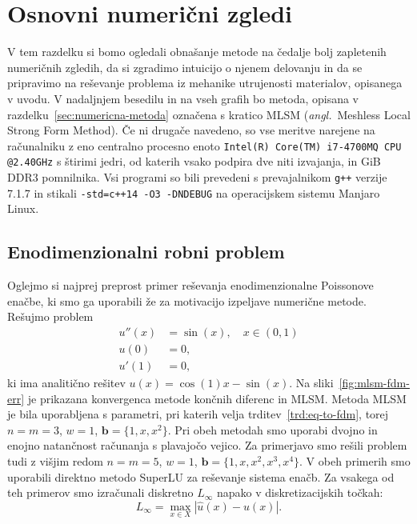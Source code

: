\documentclass[12pt,a4paper,twoside]{article}
\theoremstyle{definition} %
\theoremstyle{plain} %
\numberwithin{equation}{section}
\renewcommand{\b}{\boldsymbol}
\newcommand{\ang}[1]{(\textit{angl.}\ #1)}
\begin{document}
\section{Osnovni numerični zgledi}
\label{sec:osnovni-zgledi}
V tem razdelku si bomo ogledali obnašanje metode na čedalje bolj zapletenih numeričnih zgledih, da
si zgradimo intuicijo o njenem delovanju in da se pripravimo na reševanje problema iz mehanike
utrujenosti materialov, opisanega v uvodu. V nadaljnjem besedilu in na vseh grafih bo metoda,
opisana v razdelku~\ref{sec:numericna-metoda} označena s kratico MLSM \ang{Meshless Local Strong
Form Method}. Če ni drugače navedeno, so vse meritve narejene na računalniku z eno centralno
procesno enoto \verb|Intel(R) Core(TM) i7-4700MQ CPU @2.40GHz| s štirimi jedri, od katerih vsako
podpira dve niti izvajanja, in \unit[16]{GiB} DDR3 pomnilnika. Vsi programi so bili prevedeni s
prevajalnikom \verb|g++| verzije 7.1.7 in stikali \verb|-std=c++14 -O3 -DNDEBUG| na operacijskem
sistemu Manjaro Linux.

\subsection{Enodimenzionalni robni problem}
Oglejmo si najprej preprost primer reševanja enodimenzionalne Poissonove enačbe, ki smo ga uporabili
že za motivacijo izpeljave numerične metode.  Rešujmo problem
\begin{align}
  u''(x) &= \sin(x), \quad x \in (0, 1) \nonumber \\
  u(0) &= 0,  \\
  u'(1) &= 0, \nonumber
\end{align}
ki ima analitično rešitev $u(x) = \cos(1) x - \sin(x)$.
Na sliki~\ref{fig:mlsm-fdm-err} je prikazana konvergenca metode končnih diferenc
in MLSM. Metoda MLSM je bila uporabljena s parametri, pri katerih velja
trditev~\ref{trd:eq-to-fdm}, torej $n=m=3$, $w=1$, $\b b = \{1, x, x^2\}$.
Pri obeh metodah smo uporabi dvojno in enojno natančnost računanja s plavajočo
vejico.  Za primerjavo smo rešili problem tudi z višjim redom $n=m=5$, $w=1$,
$\b b = \{1, x, x^2, x^3, x^4\}$. V obeh primerih smo uporabili direktno metodo
SuperLU za reševanje sistema enačb. Za vsakega od teh primerov smo izračunali
diskretno $L_\infty$ napako v diskretizacijskih točkah: \[ L_\infty = \max_{x\in
X} |\hat{u}(x) - u(x)|.  \]
\end{document}
